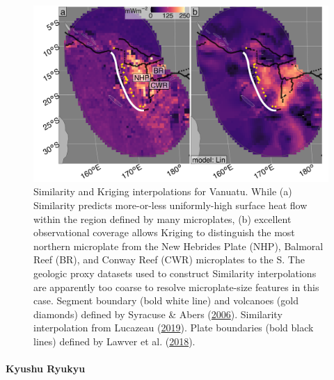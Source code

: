 \begin{figure}[htbp]

{\centering \includegraphics[width=1\linewidth,]{assets/figs/chpt3/VanuatuDiffComp} 

}

\caption[Similarity and Kriging interpolations for Central America]{Similarity and Kriging interpolations for Vanuatu. While (a) Similarity predicts more-or-less uniformly-high surface heat flow within the region defined by many microplates, (b) excellent observational coverage allows Kriging to distinguish the most northern microplate from the New Hebrides Plate (NHP), Balmoral Reef (BR), and Conway Reef (CWR) microplates to the S. The geologic proxy datasets used to construct Similarity interpolations are apparently too coarse to resolve microplate-size features in this case. Segment boundary (bold white line) and volcanoes (gold diamonds) defined by Syracuse \& Abers (\protect\hyperlink{ref-syracuse2006}{2006}). Similarity interpolation from Lucazeau (\protect\hyperlink{ref-lucazeau2019}{2019}). Plate boundaries (bold black lines) defined by Lawver et al. (\protect\hyperlink{ref-lawver2018}{2018}).}\label{fig:vanuatuDiff}
\end{figure}

\hypertarget{kyushu-ryukyu}{%
\paragraph{Kyushu Ryukyu}\label{kyushu-ryukyu}}

